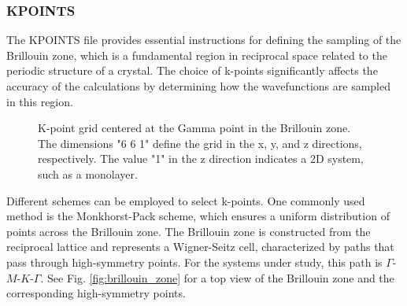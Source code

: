 \subsubsection{KPOINTS}
The KPOINTS file provides essential instructions for defining the sampling of the Brillouin zone, which is a fundamental region in reciprocal space related to the periodic structure of a crystal. The choice of k-points significantly affects the accuracy of the calculations by determining how the wavefunctions are sampled in this region.
\begin{figure}[H]
	\centering
	\caption{K-point grid centered at the Gamma point in the Brillouin zone. The dimensions "6 6 1" define the grid in the x, y, and z directions, respectively. The value "1" in the z direction indicates a 2D system, such as a monolayer.}
	\label{fig:fig3.3}
	\label{kpoints}
\end{figure}
Different schemes can be employed to select k-points. One commonly used method is the Monkhorst-Pack scheme, which ensures a uniform distribution of points across the Brillouin zone. The Brillouin zone is constructed from the reciprocal lattice and represents a Wigner-Seitz cell, characterized by paths that pass through high-symmetry points. For the systems under study, this path is $\Gamma$-$M$-$K$-$\Gamma$. See Fig. \ref{fig:brillouin_zone} for a top view of the Brillouin zone and the corresponding high-symmetry points.

